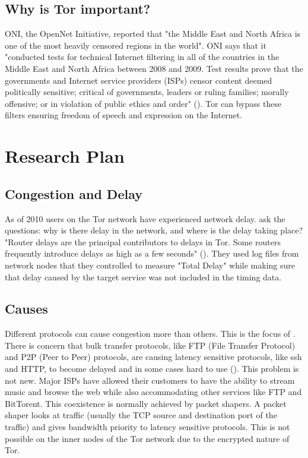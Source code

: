 \documentclass[letterpaper,13pt]{texMemo}
\begin{document}
    \subsection*{Why is Tor important?}
    ONI, the OpenNet Initiative, reported that "the Middle East and North Africa is one of the most
    heavily censored regions in the world". ONI says that it "conducted tests for technical
    Internet filtering in all of the countries in the Middle East and North Africa between 2008 and
    2009. Test results prove that the governments and Internet service providers (ISPs) censor
    content deemed politically sensitive; critical of governments, leaders or ruling families;
    morally offensive; or in violation of public ethics and order" (\citeauthor[6]{ONI}). Tor can
    bypass these filters ensuring freedom of speech and expression on the Internet.

\section*{Research Plan}


    \subsection*{Congestion and Delay}
    As of 2010 users on the Tor network have experienced network delay. \citeauthor[]{delay} ask the
    questions: why is there delay in the network, and where is the delay taking place? "Router delays
    are the principal contributors to delays in Tor. Some routers frequently introduce delays as
    high as a few seconds" (\citeauthor[3]{delay}). They used log files from network nodes that they
    controlled to measure "Total Delay" while making sure that delay caused by the target service was not
    included in the timing data.

    \subsection*{Causes}
    Different protocols can cause congestion more than others. This is the focus of
    \citeauthor{analysis}. There is concern that bulk transfer protocols, like FTP (File Transfer
    Protocol) and P2P (Peer to Peer) protocols, are causing latency sensitive protocols, like ssh
    and HTTP, to become delayed and in some cases hard to use (\citeauthor[2]{analysis}). This
    problem is not new. Major ISPs have allowed their customers to have
    the ability to stream music and browse the web while also accommodating other services like FTP
    and BitTorent. This coexistence is normally achieved by packet shapers. A packet shaper looks
    at traffic (usually the TCP source and destination port of the traffic) and gives bandwidth priority
    to latency sensitive protocols. This is not possible on the inner nodes of the Tor network due
    to the encrypted nature of Tor.
\end{document}
